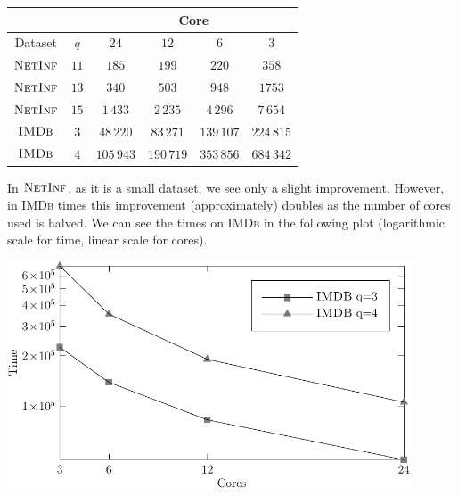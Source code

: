 \begin{table}[h]
	\centering
	\begin{tabular}{|c|c|c|c|c|c|}
		\cline{3-6}
		\multicolumn{2}{c}{} & \multicolumn{4}{|c|}{ Core } \\ 
		\hline
		Dataset           & $q$  & $24$       & $12$       & $6$        & $3$        \\  \hline \hline
		$\textsc{NetInf}$ & $11$ & $185$      & $199$      & $220$      & $358$      \\  \hline
		$\textsc{NetInf}$ & $13$ & $340$      & $503$      & $948$      & $1753$     \\  \hline
		$\textsc{NetInf}$ & $15$ & $1\,433$   & $2\,235$   & $4\,296$   & $7\,654$   \\  \hline \hline
		$\textsc{IMDb}$   & $3$  & $48\,220$  & $83\,271$  & $139\,107$ & $224\,815$ \\  \hline
		$\textsc{IMDb}$   & $4$  & $105\,943$ & $190\,719$ & $353\,856$ & $684\,342$ \\  \hline
		
	\end{tabular}
\end{table}

In $\textsc{NetInf}$, as it is a small dataset, we see only a slight improvement. 
However, in \textsc{IMDb} times this improvement (approximately) doubles as the number of cores used is halved.
We can see the times on \textsc{IMDb} in the following plot (logarithmic scale for time, linear scale for cores).\bigskip

\begin{minipage}[h]{0.9\textwidth}
 \centering
 \includegraphics[width=0.9\textwidth]{figure/figure-4-1}
\end{minipage}

\noindent

\clearpage
